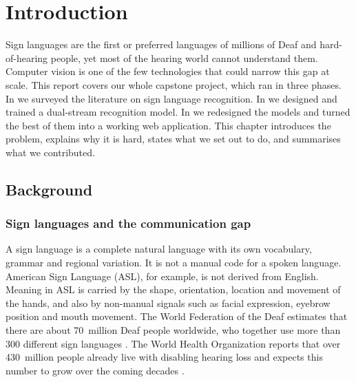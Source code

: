 \chapter{Introduction}
\label{ch:introduction}

Sign languages are the first or preferred languages of millions of Deaf
and hard-of-hearing people, yet most of the hearing world cannot
understand them. Computer vision is one of the few technologies that could
narrow this gap at scale. This report covers our whole capstone
project, which ran in three phases. In \capA{} we surveyed the literature
on sign language recognition. In \capB{} we designed and trained a
dual-stream recognition model. In \capC{} we redesigned the models and
turned the best of them into a working web application. This chapter
introduces the problem, explains why it is hard, states what we set out to
do, and summarises what we contributed.

\section{Background}
\label{sec:background}

\subsection{Sign languages and the communication gap}

A sign language is a complete natural language with its own vocabulary,
grammar and regional variation. It is not a manual code for a spoken
language. American Sign Language (ASL), for example, is not derived from
English. Meaning in ASL is carried by the shape, orientation, location and
movement of the hands, and also by non-manual signals such as facial
expression, eyebrow position and mouth movement. The World Federation of
the Deaf estimates that there are about 70~million Deaf people worldwide,
who together use more than 300 different sign languages
\cite{wfd2023deaf}. The World Health Organization reports that over
430~million people already live with disabling hearing loss and expects
this number to grow over the coming decades \cite{who2021hearing}.

